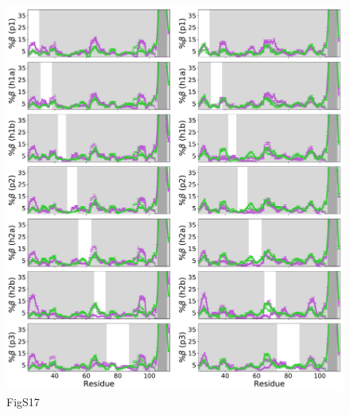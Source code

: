 \documentclass[10pt,letterpaper]{article}
\begin{document}
\begin{figure}[!ht]
\includegraphics[scale=0.5,width=\textwidth,trim={0 0cm 0 0cm},clip]{./figures/S17.pdf}
\caption{{FigS17}}
\end{figure}
\end{document}
